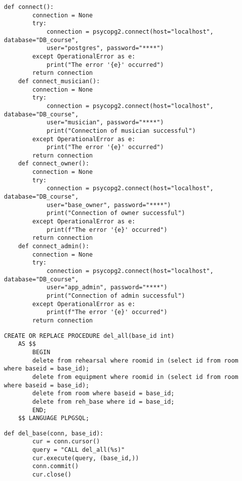 \clearpage

 \label{app:db}

\begin{lstlisting}[caption={подключение к БД с разными ролями}]
    def connect():
    	connection = None
    	try:
    		connection = psycopg2.connect(host="localhost", database="DB_course",
    		user="postgres", password="****")
    	except OperationalError as e:
    		print("The error '{e}' occurred")
    	return connection
    def connect_musician():
    	connection = None
    	try:
    		connection = psycopg2.connect(host="localhost", database="DB_course",
    		user="musician", password="****")
    		print("Connection of musician successful")
    	except OperationalError as e:
   			print("The error '{e}' occurred")
    	return connection
    def connect_owner():
    	connection = None
    	try:
    		connection = psycopg2.connect(host="localhost", database="DB_course",
    		user="base_owner", password="****")
    		print("Connection of owner successful")
    	except OperationalError as e:
    		print(f"The error '{e}' occurred")
    	return connection
    def connect_admin():
    	connection = None
    	try:
    		connection = psycopg2.connect(host="localhost", database="DB_course",
    		user="app_admin", password="****")
    		print("Connection of admin successful")
    	except OperationalError as e:
    		print(f"The error '{e}' occurred")
    	return connection
\end{lstlisting}

\clearpage

 \label{app:proc}

\begin{lstlisting}[caption={процедура удаления реп. базы}]
    CREATE OR REPLACE PROCEDURE del_all(base_id int)
    AS $$
    	BEGIN
    	delete from rehearsal where roomid in (select id from room where baseid = base_id);
    	delete from equipment where roomid in (select id from room where baseid = base_id);
    	delete from room where baseid = base_id;
    	delete from reh_base where id = base_id;
    	END;
    $$ LANGUAGE PLPGSQL;
\end{lstlisting}

\clearpage

 \label{app:dell_all}

\begin{lstlisting}[caption={применение процедуры при удалении реп. базы}]
	def del_base(conn, base_id):
		cur = conn.cursor()
		query = "CALL del_all(%s)"
		cur.execute(query, (base_id,))
		conn.commit()
		cur.close()
\end{lstlisting}
